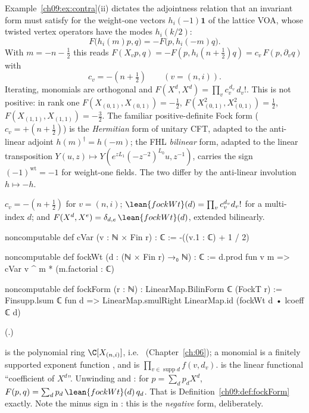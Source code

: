 Example~\ref{ch09:ex:contra}(ii) dictates the adjointness relation that an invariant form must
satisfy for the weight-one vectors $h_i(-1)\mathbf1$ of the lattice VOA, whose twisted vertex
operators have the modes $h_i(k/2)$:
\begin{equation}\label{ch09:eq:hadj}
F\big(h_i(m)p,q\big)=-F\big(p,h_i(-m)q\big).
\end{equation}
With $m=-n-\tfrac12$ this reads $F(X_vp,q)=-F(p,h_i(n+\tfrac12)q)=c_v\,F(p,\partial_vq)$ with
\begin{equation*}
c_v=-(n+\tfrac12)\qquad (v=(n,i)).
\end{equation*}
Iterating, monomials are orthogonal and $F(X^d,X^d)=\prod_v c_v^{\,d_v}\,d_v!$. This is not
positive: in rank one $F(X_{(0,1)},X_{(0,1)})=-\tfrac12$, $F(X_{(0,1)}^2,X_{(0,1)}^2)=\tfrac12$,
$F(X_{(1,1)},X_{(1,1)})=-\tfrac32$. The familiar positive-definite Fock form
($c_v=+(n+\frac12)$) is the \emph{Hermitian} form of unitary CFT, adapted to the anti-linear
adjoint $h(m)^\dagger=h(-m)$; the FHL \emph{bilinear} form, adapted to the linear transposition
$Y(u,z)\mapsto Y(e^{zL_1}(-z^{-2})^{L_0}u,z^{-1})$, carries the sign $(-1)^{\mathrm{wt}}=-1$ for
weight-one fields. The two differ by the anti-linear involution $h\mapsto-h$.

\begin{definition}\label{ch09:def:fockForm}
$c_v=-(n+\tfrac12)$ for $v=(n,i)$; $\lean{fockWt}(d)=\prod_v c_v^{d_v}d_v!$ for a multi-index
$d$; and $F(X^d,X^e)=\delta_{d,e}\,\lean{fockWt}(d)$, extended bilinearly.
\end{definition}
\begin{leancode}
noncomputable def cVar (v : ℕ × Fin r) : ℂ := -((v.1 : ℂ) + 1 / 2)

noncomputable def fockWt (d : (ℕ × Fin r) →₀ ℕ) : ℂ :=
  d.prod fun v m => cVar v ^ m * (m.factorial : ℂ)

noncomputable def fockForm (r : ℕ) : LinearMap.BilinForm ℂ (FockT r) :=
  Finsupp.lsum ℂ fun d => LinearMap.smulRight LinearMap.id (fockWt d • lcoeff ℂ d)
\end{leancode}
(.)
\begin{dictionary}
 is the polynomial ring $\C[X_{(n,i)}]$, i.e.\ 
(Chapter~\ref{ch:06}); a monomial is a finitely supported exponent function
, and  is $\prod_{v\in\operatorname{supp}d}f(v,d_v)$.
 is the linear functional ``coefficient of $X^d$''. Unwinding 
and : for $p=\sum_dp_dX^d$, $F(p,q)=\sum_dp_d\,\lean{fockWt}(d)\,q_d$. That is
Definition~\ref{ch09:def:fockForm} exactly. Note the minus sign in : this is the
\emph{negative} form, deliberately.
\end{dictionary}

